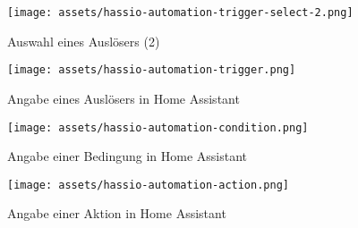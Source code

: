 \blindtext

\begin{figure}[!htb]
  \texttt{[image: assets/hassio-automation-trigger-select-2.png]}
  \caption{Auswahl eines Auslösers (2)}
  \endminipage
  \hfill
  \texttt{[image: assets/hassio-automation-trigger.png]}
  \caption{Angabe eines Auslösers in Home Assistant}
  \endminipage
\end{figure}

\blindtext

\begin{figure}[!htb]
  \texttt{[image: assets/hassio-automation-condition.png]}
  \caption{Angabe einer Bedingung in Home Assistant}
  \endminipage
  \hfill
  \texttt{[image: assets/hassio-automation-action.png]}
  \caption{Angabe einer Aktion in Home Assistant}
  \endminipage
\end{figure}

\blindtext



